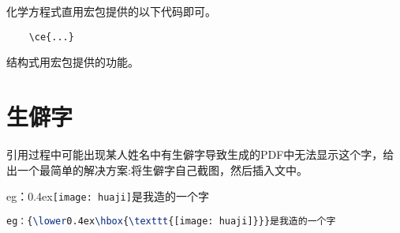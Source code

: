 化学方程式直用宏包提供的以下代码即可。
\begin{lstlisting}
	\ce{...}
\end{lstlisting} 
\begin{center}
\end{center}
结构式用宏包提供的功能。
\begin{center}
\end{center}

\section{生僻字}
引用过程中可能出现某人姓名中有生僻字导致生成的PDF中无法显示这个字，给出一个最简单的解决方案:将生僻字自己截图，然后插入文中。

eg：{\lower0.4ex\hbox{\texttt{[image: huaji]}}}是我造的一个字
\begin{lstlisting}[language=TeX]
	eg：{\lower0.4ex\hbox{\texttt{[image: huaji]}}}是我造的一个字
\end{lstlisting}